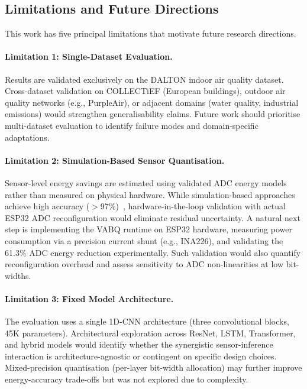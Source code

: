 \subsection{Limitations and Future Directions}
\label{sec:disc_limitations}

This work has five principal limitations that motivate future research directions.

\paragraph{Limitation 1: Single-Dataset Evaluation.} Results are validated exclusively on the DALTON indoor air quality dataset. Cross-dataset validation on COLLECTiEF (European buildings), outdoor air quality networks (e.g., PurpleAir), or adjacent domains (water quality, industrial emissions) would strengthen generalisability claims. Future work should prioritise multi-dataset evaluation to identify failure modes and domain-specific adaptations.

\paragraph{Limitation 2: Simulation-Based Sensor Quantisation.} Sensor-level energy savings are estimated using validated ADC energy models rather than measured on physical hardware. While simulation-based approaches achieve high accuracy ($>$97\%)~\cite{yilmaz2024simulation}, hardware-in-the-loop validation with actual ESP32 ADC reconfiguration would eliminate residual uncertainty. A natural next step is implementing the VABQ runtime on ESP32 hardware, measuring power consumption via a precision current shunt (e.g., INA226), and validating the 61.3\% ADC energy reduction experimentally. Such validation would also quantify reconfiguration overhead and assess sensitivity to ADC non-linearities at low bit-widths.

\paragraph{Limitation 3: Fixed Model Architecture.} The evaluation uses a single 1D-CNN architecture (three convolutional blocks, 45K parameters). Architectural exploration across ResNet, LSTM, Transformer, and hybrid models would identify whether the synergistic sensor-inference interaction is architecture-agnostic or contingent on specific design choices. Mixed-precision quantisation (per-layer bit-width allocation) may further improve energy-accuracy trade-offs but was not explored due to complexity.


